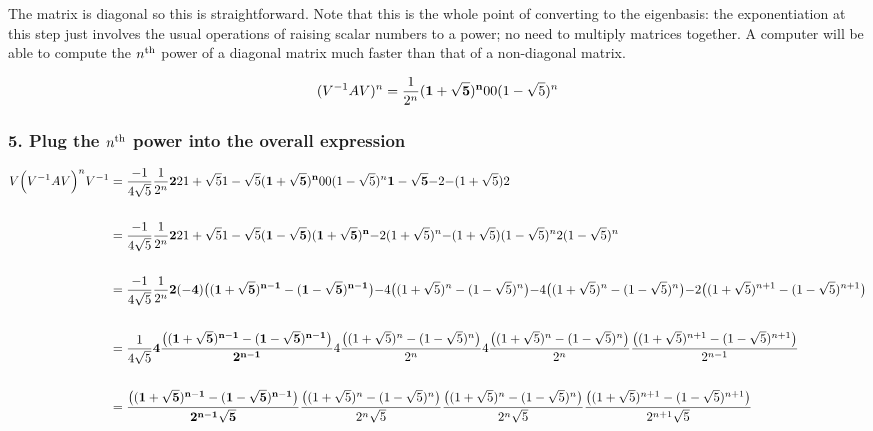 The matrix is diagonal so this is straightforward. Note that this is the whole
point of converting to the eigenbasis: the exponentiation at this step just
involves the usual operations of raising scalar numbers to a power; no need to
multiply matrices together. A computer will be able to compute the $n^{\text{th}}$ power
of a diagonal matrix much faster than that of a non-diagonal matrix.

$$
(V^{-1}AV)^n = \frac{1}{2^n} \mathbf{(1 + \sqrt 5)^n}{0          }
                                 {0              }{(1 - \sqrt 5)^n}
$$

\subsubsection{5. Plug the $n^{\text{th}}$ power into the overall expression}

\begin{align*}
V \Big(V^{-1}AV\Big)^n V^{-1}
&=
\frac{-1}{4\sqrt 5}
\frac{1}{2^n}
\mathbf{2          }{2          }
    {1 + \sqrt 5}{1 - \sqrt 5}
\mathbf{(1 + \sqrt 5)^n}{0              }
    {0              }{(1 - \sqrt 5)^n}
\mathbf{1 - \sqrt 5 }{-2}
    {-(1 + \sqrt 5)}{2}
\\\\
&=
\frac{-1}{4\sqrt 5}
\frac{1}{2^n}
\mathbf{2          }{2          }
    {1 + \sqrt 5}{1 - \sqrt 5}
\mathbf{(1 - \sqrt 5)(1 + \sqrt 5)^n}{-2(1 + \sqrt 5)^n}
    {-(1 + \sqrt 5)(1 - \sqrt 5)^n}{2(1 - \sqrt 5)^n}
\\\\
&=
\frac{-1}{4\sqrt 5}
\frac{1}{2^n}
\mathbf{2(-4)\big((1 + \sqrt 5)^{n-1} - (1 - \sqrt 5)^{n-1}\big)}{-4\big((1 + \sqrt 5)^n     - (1 - \sqrt 5)^n    \big)}
    {   -4\big((1 + \sqrt 5)^n     - (1 - \sqrt 5)^n    \big)}{-2\big((1 + \sqrt 5)^{n+1} - (1 - \sqrt 5)^{n+1}\big)}
\\\\
&=
\frac{1}{4\sqrt 5}
\mathbf{4\frac{\big((1 + \sqrt 5)^{n-1} - (1 - \sqrt 5)^{n-1}\big)}{2^{n-1}}}{4\frac{\big((1 + \sqrt 5)^n     - (1 - \sqrt 5)^n    \big)}{2^n    }}
    {4\frac{\big((1 + \sqrt 5)^n     - (1 - \sqrt 5)^n    \big)}{2^n    }}{ \frac{\big((1 + \sqrt 5)^{n+1} - (1 - \sqrt 5)^{n+1}\big)}{2^{n-1}}}
\\\\
&=
\mathbf{\frac{\big((1 + \sqrt 5)^{n-1} - (1 - \sqrt 5)^{n-1}\big)}{2^{n-1}\sqrt 5}}{\frac{\big((1 + \sqrt 5)^n     - (1 - \sqrt 5)^n    \big)}{2^n    \sqrt 5}}
    {\frac{\big((1 + \sqrt 5)^n     - (1 - \sqrt 5)^n    \big)}{2^n    \sqrt 5}}{\frac{\big((1 + \sqrt 5)^{n+1} - (1 - \sqrt 5)^{n+1}\big)}{2^{n+1}\sqrt 5}}
\end{align*}


